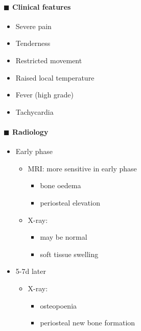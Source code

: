 \documentclass[
  14pt,
]{extarticle}
\providecommand{\tightlist}{%
  \setlength{\itemsep}{0pt}\setlength{\parskip}{0pt}}
\begin{document}
\hypertarget{blacksquare-clinical-features}{%
\paragraph{\texorpdfstring{\(\blacksquare\) Clinical
features}{\textbackslash blacksquare Clinical features}}\label{blacksquare-clinical-features}}

\begin{itemize}
\tightlist
\item
  Severe pain
\item
  Tenderness
\item
  Restricted movement
\item
  Raised local temperature
\item
  Fever (high grade)
\item
  Tachycardia
\end{itemize}

\hypertarget{blacksquare-radiology}{%
\paragraph{\texorpdfstring{\(\blacksquare\)
Radiology}{\textbackslash blacksquare Radiology}}\label{blacksquare-radiology}}

\begin{itemize}
\tightlist
\item
  Early phase

  \begin{itemize}
  \tightlist
  \item
    MRI: more sensitive in early phase

    \begin{itemize}
    \tightlist
    \item
      bone oedema
    \item
      periosteal elevation
    \end{itemize}
  \item
    X-ray:

    \begin{itemize}
    \tightlist
    \item
      may be normal
    \item
      soft tissue swelling
    \end{itemize}
  \end{itemize}
\item
  5-7d later

  \begin{itemize}
  \tightlist
  \item
    X-ray:

    \begin{itemize}
    \tightlist
    \item
      osteopoenia
    \item
      periosteal new bone formation
    \end{itemize}
  \end{itemize}
\end{itemize}
\end{document}
